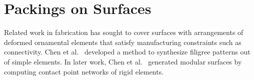 \section{Packings on Surfaces}
Related work in fabrication has sought to cover surfaces with
arrangements of deformed ornamental elements that satisfy manufacturing
constraints such as connectivity.  Chen et al.~\cite{Chen2016}
developed a method to synthesize filigree patterns out of simple
elements. 
In later work, Chen et al.~\cite{Chen2017}
generated modular surfaces by computing 
contact point networks of rigid elements.





